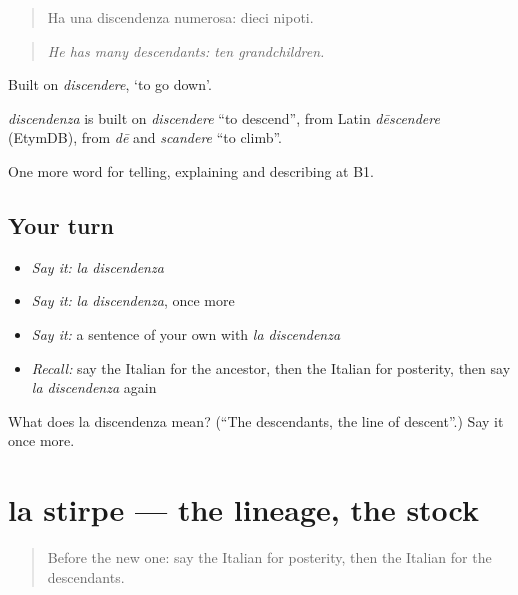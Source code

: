 \begin{quote}
Ha una discendenza numerosa: dieci nipoti.
\end{quote}

\begin{quote}
\emph{He has many descendants: ten grandchildren.}
\end{quote}

Built on \emph{discendere}, ‘to go down’.

\begin{cousinweb}
\emph{discendenza} is built on \emph{discendere} \textquotedblleft{}to descend\textquotedblright{}, from Latin \emph{dēscendere} (EtymDB), from \emph{dē} and \emph{scandere} \textquotedblleft{}to climb\textquotedblright{}.
\end{cousinweb}

\begin{grammarlens}[title={What you've built}]
One more word for telling, explaining and describing at B1.
\end{grammarlens}

\subsection*{Your turn}
\begin{itemize}
\raggedright
  \item \emph{Say it:} \emph{la discendenza}
  \item \emph{Say it:} \emph{la discendenza}, once more
  \item \emph{Say it:} a sentence of your own with \emph{la discendenza}
  \item \emph{Recall:} say the Italian for the ancestor, then the Italian for posterity, then say \emph{la discendenza} again
\end{itemize}

\begin{tcolorbox}[breakable,colback=teal!4,colframe=teal!35!black,title={Before you move on}]
What does la discendenza mean? (\textquotedblleft{}The descendants, the line of descent\textquotedblright{}.) Say it once more.
\end{tcolorbox}
\section[la stirpe]{la stirpe — the lineage, the stock}

\label{lesson:IT-C312-stirpe}



\begin{quote}
Before the new one: say the Italian for posterity, then the Italian for the descendants.
\end{quote}

